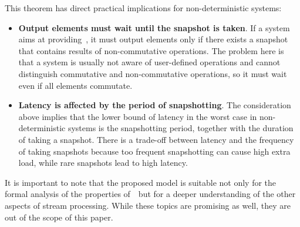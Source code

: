 This theorem has direct practical implications for non-deterministic systems:
\begin{itemize}
    \item {\bf Output elements must wait until the snapshot is taken}. If a system aims at providing~\eo, it must output elements only if there exists a snapshot that contains results of non-commutative operations. The problem here is that a system is usually not aware of user-defined operations and cannot distinguish commutative and non-commutative operations, so it must wait even if all elements commutate.
    \item {\bf Latency is affected by the period of snapshotting}. The consideration above implies that the lower bound of latency in the worst case in non-deterministic systems is the snapshotting period, together with the duration of taking a snapshot. There is a trade-off between latency and the frequency of taking snapshots because too frequent snapshotting can cause high extra load, while rare snapshots lead to high latency.
\end{itemize}

It is important to note that the proposed model is suitable not only for the formal analysis of the properties of~\eo\ but for a deeper understanding of the other aspects of stream processing. While these topics are promising as well, they are out of the scope of this paper.
